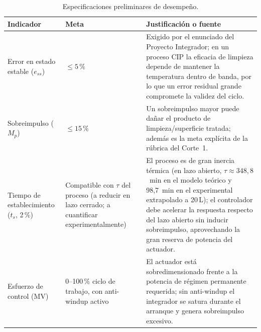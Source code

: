 \begin{table}[H]\centering\small\caption{Especificaciones preliminares de desempeño.}\label{tab:especificaciones_control}
\begin{tabularx}{\textwidth}{L{3.2cm}L{2.9cm}Y}\toprule
\textbf{Indicador}&\textbf{Meta}&\textbf{Justificación o fuente}\\\midrule
Error en estado estable ($e_{ss}$)&$\leq 5\,\%$&Exigido por el enunciado del Proyecto Integrador; en un proceso CIP la eficacia de limpieza depende de mantener la temperatura dentro de banda, por lo que un error residual grande compromete la validez del ciclo.\\
Sobreimpulso ($M_p$)&$\leq 15\,\%$&Un sobreimpulso mayor puede dañar el producto de limpieza/superficie tratada; además es la meta explícita de la rúbrica del Corte~1.\\
Tiempo de establecimiento ($t_s$, 2\,\%)&Compatible con $\tau$ del proceso (a reducir en lazo cerrado; a cuantificar experimentalmente)&El proceso es de gran inercia térmica (en lazo abierto, $\tau\approx348{,}8$~min en el modelo teórico y 98,7~min en el experimental extrapolado a 20\,L); el controlador debe acelerar la respuesta respecto del lazo abierto sin inducir sobreimpulso, aprovechando la gran reserva de potencia del actuador.\\
Esfuerzo de control (MV)&0--100\,\% ciclo de trabajo, con anti-windup activo&El actuador está sobredimensionado frente a la potencia de régimen permanente requerida; sin anti-windup el integrador se satura durante el arranque y genera sobreimpulso excesivo.\\
\bottomrule
\end{tabularx}\end{table}